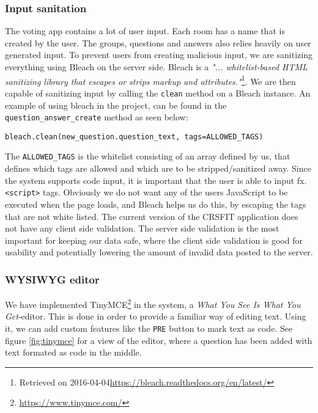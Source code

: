 \subsubsection*{Input sanitation}
The voting app contains a lot of user input. Each room has a name that is created by the user. The groups, questions and answers also relies heavily on user generated input. To prevent users from creating malicious input, we are sanitizing everything using Bleach on the server side. Bleach is a \emph{"... whitelist-based HTML sanitizing library that escapes or strips markup and attributes."}\footnote{Retrieved on 2016-04-04\url{https://bleach.readthedocs.org/en/latest/}}. We are then capable of sanitizing input by calling the \texttt{clean} method on a Bleach instance. An example of using bleach in the project, can be found in the \texttt{question\_answer\_create} method as seen below:

\begin{lstlisting}[caption=Using Bleach to sanitize input, label=lst:bleach]
bleach.clean(new_question.question_text, tags=ALLOWED_TAGS)
\end{lstlisting}

The \texttt{ALLOWED\_TAGS} is the whitelist consisting of an array defined by us, that defines which tags are allowed and which are to be stripped/sanitized away. Since the system supports code input, it is important that the user is able to input fx. \texttt{<script>} tags. Obviously we do not want any of the users JavaScript to be executed when the page loads, and Bleach helps us do this, by escaping the tags that are not white listed.
The current version of the CRSFIT application does not have any client side validation. The server side validation is the most important for keeping our data safe, where the client side validation is good for usability and potentially lowering the amount of invalid data posted to the server. 

\subsubsection*{WYSIWYG editor}
We have implemented TinyMCE\footnote{\url{https://www.tinymce.com/}} in the system, a \emph{What You See Is What You Get}-editor. This is done in order to provide a familiar way of editing text. Using it, we can add custom features like the \texttt{PRE} button to mark text as code. See figure \ref{fig:tinymce} for a view of the editor, where a question has been added with text formated as code in the middle.


